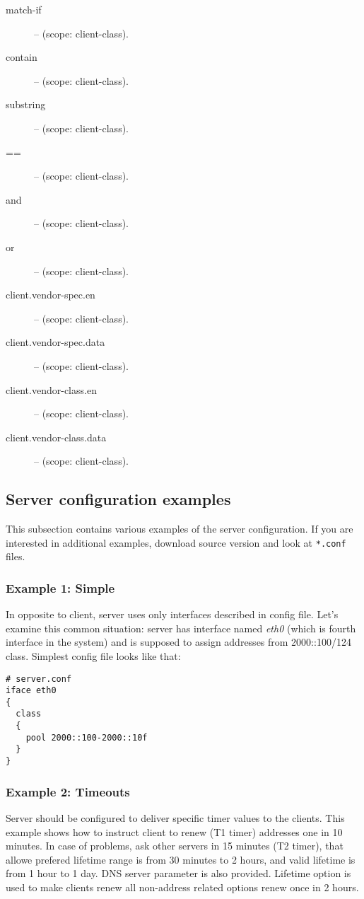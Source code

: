 \begin{description}
\item[match-if] -- (scope: client-class). 
\item[contain] -- (scope: client-class).
\item[substring] -- (scope: client-class).
\item[==] -- (scope: client-class).
\item[and] -- (scope: client-class).
\item[or] -- (scope: client-class).
\item[client.vendor-spec.en] -- (scope: client-class).
\item[client.vendor-spec.data] -- (scope: client-class).
\item[client.vendor-class.en] -- (scope: client-class).
\item[client.vendor-class.data] -- (scope: client-class).
\end{description}


\subsection{Server configuration examples}

This subsection contains various examples of the server
configuration. If you are interested in additional examples, download
source version and look at \verb+*.conf+ files.

\subsubsection{Example 1: Simple}

In opposite to client, server uses only interfaces described in config
file. Let's examine this common situation: server has interface named
\emph{eth0} (which is fourth interface in the system) and is supposed
to assign addresses from 2000::100/124 class. Simplest config file
looks like that:

\begin{lstlisting}
# server.conf
iface eth0
{
  class
  {
    pool 2000::100-2000::10f
  }
}
\end{lstlisting}

\subsubsection{Example 2: Timeouts}
Server should be configured to deliver specific timer values to the
clients. This example shows how to instruct client to renew (T1 timer)
addresses one in 10 minutes. In case of problems, ask other servers in
15 minutes (T2 timer), that allowe prefered lifetime range is from 30
minutes to 2 hours, and valid lifetime is from 1 hour to 1 day. DNS
server parameter is also provided. Lifetime option is used to make
clients renew all non-address related options renew once in 2 hours.

